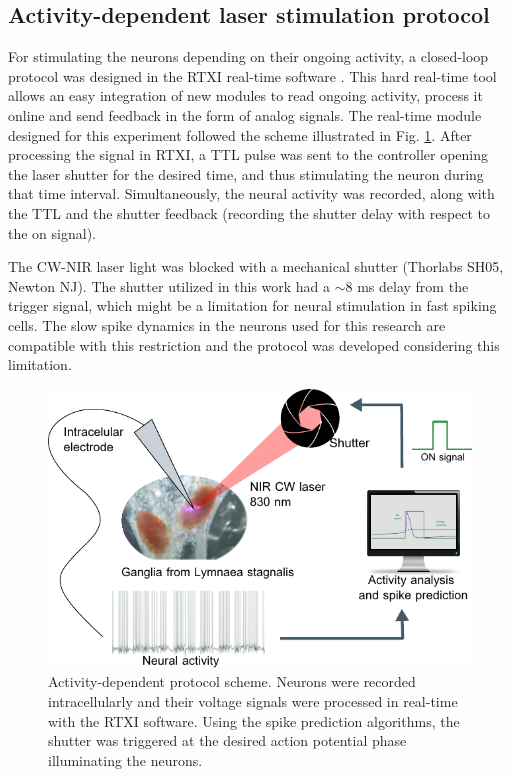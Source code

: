 \subsection{Activity-dependent laser stimulation protocol} 
\label{sect:methods-activity-dependent}

For stimulating the neurons depending on their ongoing activity, a closed-loop protocol was designed in the RTXI real-time software \parencite{patel_hard_2017}. This hard real-time tool allows an easy integration of new modules to read ongoing activity, process it online and send feedback in the form of analog signals. The real-time module designed for this experiment followed the scheme illustrated in Fig. \ref{fig:activity dependent protocol}. After processing the signal in RTXI, a TTL pulse was sent to the controller opening the laser shutter for the desired time, and thus stimulating the neuron during that time interval. Simultaneously, the neural activity was recorded, along with the TTL and the shutter feedback (recording the shutter delay with respect to the on signal).

The CW-NIR laser light was blocked with a mechanical shutter (Thorlabs SH05, Newton NJ). The shutter utilized in this work had a $\sim 8$ ms delay from the trigger signal, which might be a limitation for neural stimulation in fast spiking cells. The slow spike dynamics in the neurons used for this research are compatible with this restriction and the protocol was developed considering this limitation. 


\begin{figure}[htb!]
	\includegraphics[width=\textwidth]{img/laser/activity_dependent_protocol.pdf}
	\caption{Activity-dependent protocol scheme. Neurons were recorded intracellularly and their voltage signals were processed in real-time with the RTXI software. Using the spike prediction algorithms, the shutter was triggered at the desired action potential phase illuminating the neurons.}
	\label{fig:activity dependent protocol}
\end{figure}


